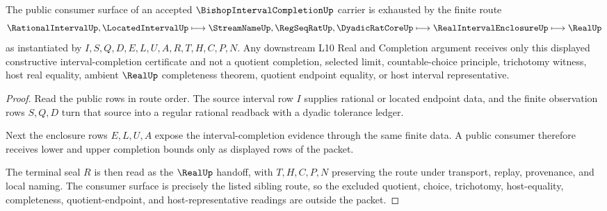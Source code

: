 \begin{theorem}
\label{thm:bishop-interval-completion-public-route}
The public consumer surface of an accepted $\BishopIntervalCompletionUp$ carrier is exhausted by the finite route
$$
\RationalIntervalUp,\LocatedIntervalUp \longmapsto \StreamNameUp,\RegSeqRatUp,\DyadicRatCoreUp \longmapsto \RealIntervalEnclosureUp \longmapsto \RealUp
$$
as instantiated by $I,S,Q,D,E,L,U,A,R,T,H,C,P,N$. Any downstream L10 Real and Completion argument receives only this displayed constructive interval-completion certificate and not a quotient completion, selected limit, countable-choice principle, trichotomy witness, host real equality, ambient $\RealUp$ completeness theorem, quotient endpoint equality, or host interval representative.
\end{theorem}
\begin{proof}
Read the public rows in route order. The source interval row $I$ supplies rational or located endpoint data, and the finite observation rows $S,Q,D$ turn that source into a regular rational readback with a dyadic tolerance ledger.

Next the enclosure rows $E,L,U,A$ expose the interval-completion evidence through the same finite data. A public consumer therefore receives lower and upper completion bounds only as displayed rows of the packet.

The terminal seal $R$ is then read as the $\RealUp$ handoff, with $T,H,C,P,N$ preserving the route under transport, replay, provenance, and local naming. The consumer surface is precisely the listed sibling route, so the excluded quotient, choice, trichotomy, host-equality, completeness, quotient-endpoint, and host-representative readings are outside the packet.
\end{proof}

